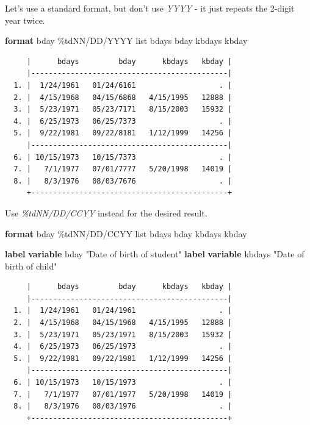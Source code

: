 \documentclass[
]{book}
\newenvironment{Shaded}{\begin{snugshade}}{\end{snugshade}}
\newcommand{\KeywordTok}[1]{\textcolor[rgb]{0.13,0.29,0.53}{\textbf{#1}}}
\newcommand{\NormalTok}[1]{#1}
\newcommand{\OtherTok}[1]{\textcolor[rgb]{0.56,0.35,0.01}{#1}}
\newcommand{\StringTok}[1]{\textcolor[rgb]{0.31,0.60,0.02}{#1}}
\begin{document}
Let's use a standard format, but don't use \emph{YYYY} - it just repeats the 2-digit year twice.

\begin{Shaded}
\begin{Highlighting}[]
\KeywordTok{format}\NormalTok{ bday \%tdNN/DD/YYYY}
\OtherTok{list}\NormalTok{ bdays bday kbdays kbday}
\end{Highlighting}
\end{Shaded}

\begin{verbatim}
     |      bdays         bday      kbdays   kbday |
     |---------------------------------------------|
  1. |  1/24/1961   01/24/6161                   . |
  2. |  4/15/1968   04/15/6868   4/15/1995   12888 |
  3. |  5/23/1971   05/23/7171   8/15/2003   15932 |
  4. |  6/25/1973   06/25/7373                   . |
  5. |  9/22/1981   09/22/8181   1/12/1999   14256 |
     |---------------------------------------------|
  6. | 10/15/1973   10/15/7373                   . |
  7. |   7/1/1977   07/01/7777   5/20/1998   14019 |
  8. |   8/3/1976   08/03/7676                   . |
     +---------------------------------------------+
\end{verbatim}

Use \emph{\%tdNN/DD/CCYY} instead for the desired result.

\begin{Shaded}
\begin{Highlighting}[]
\KeywordTok{format}\NormalTok{ bday \%tdNN/DD/CCYY}
\OtherTok{list}\NormalTok{ bdays bday kbdays kbday}

\KeywordTok{label} \KeywordTok{variable}\NormalTok{ bday }\StringTok{"Date of birth of student"}
\KeywordTok{label} \KeywordTok{variable}\NormalTok{ kbdays }\StringTok{"Date of birth of child"}
\end{Highlighting}
\end{Shaded}

\begin{verbatim}
     |      bdays         bday      kbdays   kbday |
     |---------------------------------------------|
  1. |  1/24/1961   01/24/1961                   . |
  2. |  4/15/1968   04/15/1968   4/15/1995   12888 |
  3. |  5/23/1971   05/23/1971   8/15/2003   15932 |
  4. |  6/25/1973   06/25/1973                   . |
  5. |  9/22/1981   09/22/1981   1/12/1999   14256 |
     |---------------------------------------------|
  6. | 10/15/1973   10/15/1973                   . |
  7. |   7/1/1977   07/01/1977   5/20/1998   14019 |
  8. |   8/3/1976   08/03/1976                   . |
     +---------------------------------------------+
\end{verbatim}
\end{document}
